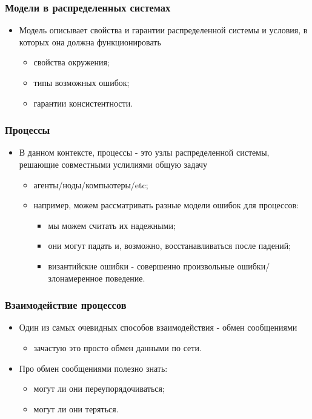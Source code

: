 \begin{frame}
\frametitle{Модели в распределенных системах}
\begin{itemize}
  \item Модель описывает свойства и гарантии распределенной системы и условия,
  в которых она должна функционировать
  \begin{itemize}
    \item свойства окружения;
    \item типы возможных ошибок;
    \item гарантии консистентности.
  \end{itemize}
\end{itemize}
\end{frame}

\begin{frame}
\frametitle{Процессы}
\begin{itemize}
  \item В данном контексте, процессы - это узлы распределенной системы, решающие
  совместными услилиями общую задачу
  \begin{itemize}
    \item агенты/ноды/компьютеры/etc;
    \item например, можем рассматривать разные модели ошибок для процессов:
    \begin{itemize}
      \item мы можем считать их надежными;
      \item они могут падать и, возможно, восстанавливаться после падений;
      \item византийские ошибки - совершенно произвольные ошибки/злонамеренное
      поведение.
    \end{itemize}
  \end{itemize}
\end{itemize}
\end{frame}

\begin{frame}
\frametitle{Взаимодействие процессов}
\begin{itemize}
  \item Один из самых очевидных способов взаимодействия - обмен сообщениями
  \begin{itemize}
    \item зачастую это просто обмен данными по сети.
  \end{itemize}
  \item Про обмен сообщениями полезно знать:
  \begin{itemize}
    \item могут ли они переупорядочиваться;
    \item могут ли они теряться.
  \end{itemize}
\end{itemize}
\end{frame}

